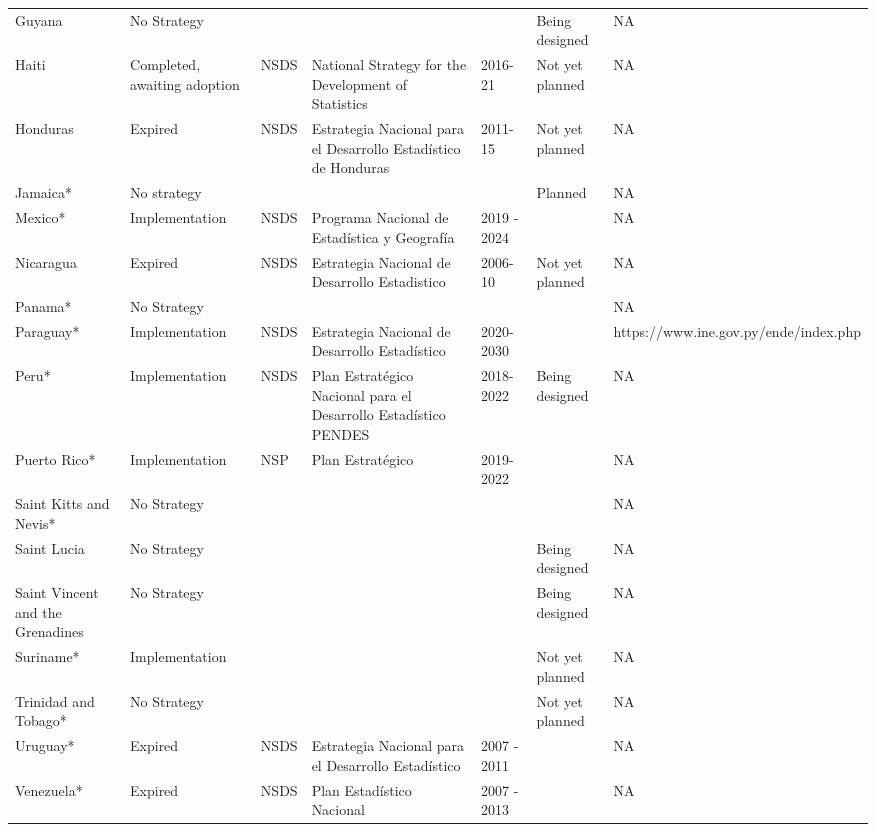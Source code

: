 \documentclass[
]{article}
\begin{document}
\begin{table}
\begin{tabular}[t]{lllllll}
Guyana & No Strategy &  &  &  & Being designed & NA\\
Haiti & Completed, awaiting adoption & NSDS & National Strategy for the Development of Statistics & 2016-21 & Not yet planned & NA\\
\addlinespace
Honduras & Expired & NSDS & Estrategia Nacional para el Desarrollo Estadístico de Honduras & 2011-15 & Not yet planned & NA\\
Jamaica* & No strategy &  &  &  & Planned & NA\\
Mexico* & Implementation & NSDS & Programa Nacional de Estadística y Geografía & 2019 - 2024 &  & NA\\
Nicaragua & Expired & NSDS & Estrategia Nacional de Desarrollo Estadistico & 2006-10 & Not yet planned & NA\\
Panama* & No Strategy &  &  &  &  & NA\\
\addlinespace
Paraguay* & Implementation & NSDS & Estrategia Nacional de Desarrollo Estadístico & 2020-2030 &  & https://www.ine.gov.py/ende/index.php\\
Peru* & Implementation & NSDS & Plan Estratégico Nacional para el Desarrollo Estadístico PENDES & 2018-2022 & Being designed & NA\\
Puerto Rico* & Implementation & NSP & Plan Estratégico & 2019-2022 &  & NA\\
Saint Kitts and Nevis* & No Strategy &  &  &  &  & NA\\
Saint Lucia & No Strategy &  &  &  & Being designed & NA\\
\addlinespace
Saint Vincent and the Grenadines & No Strategy &  &  &  & Being designed & NA\\
Suriname* & Implementation &  &  &  & Not yet planned & NA\\
Trinidad and Tobago* & No Strategy &  &  &  & Not yet planned & NA\\
Uruguay* & Expired & NSDS & Estrategia Nacional para el Desarrollo Estadístico & 2007 - 2011 &  & NA\\
Venezuela* & Expired & NSDS & Plan Estadístico Nacional & 2007 - 2013 &  & NA\\
\bottomrule
\end{tabular}
\end{table}
\end{document}
